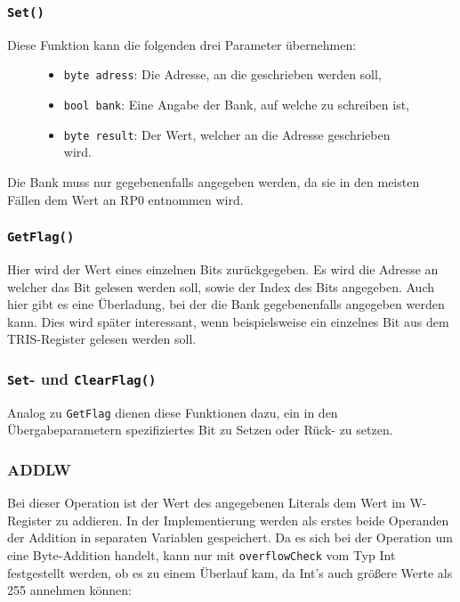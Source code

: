 \documentclass[
10pt, %
a4paper, %
oneside, %
headinclude,footinclude, %
BCOR5mm, %
]{scrartcl}
\begin{document}
		\subsubsection{\texttt{Set()}}
			Diese Funktion kann die folgenden drei Parameter übernehmen:
			
			\begin{figure}[h]
				\begin{itemize}
					\item \texttt{byte adress}: Die Adresse, an die geschrieben werden soll,
					\item \texttt{bool bank}: Eine Angabe der Bank, auf welche zu schreiben ist,
					\item \texttt{byte result}: Der Wert, welcher an die Adresse geschrieben wird.
				\end{itemize}
			\end{figure}
			Die Bank muss nur gegebenenfalls angegeben werden, da sie in den meisten Fällen dem Wert an RP0 entnommen wird.
			\newpage
		\subsubsection{\texttt{GetFlag()}}
			Hier wird der Wert eines einzelnen Bits zurückgegeben. Es wird die Adresse an welcher das Bit gelesen werden soll, sowie der Index des Bits angegeben. Auch hier gibt es eine Überladung, bei der die Bank gegebenenfalls angegeben werden kann. Dies wird später interessant, wenn beispielsweise ein einzelnes Bit aus dem TRIS-Register gelesen werden soll.
			
		\subsubsection{\texttt{Set}- und \texttt{ClearFlag()}}
		\label{sec:setClearFlag}
			Analog zu \texttt{GetFlag} dienen diese Funktionen dazu, ein in den Übergabeparametern spezifiziertes Bit zu Setzen oder Rück- zu setzen. 
			
		\subsubsection{ADDLW}
			Bei dieser Operation ist der Wert des angegebenen Literals dem Wert im W-Register zu addieren.
			In der Implementierung werden als erstes beide Operanden der Addition in separaten Variablen gespeichert. Da es sich bei der Operation um eine Byte-Addition handelt, kann nur mit \texttt{overflowCheck} vom Typ Int festgestellt werden, ob es zu einem Überlauf kam, da Int's auch größere Werte als 255 annehmen können:
			
\end{document}
